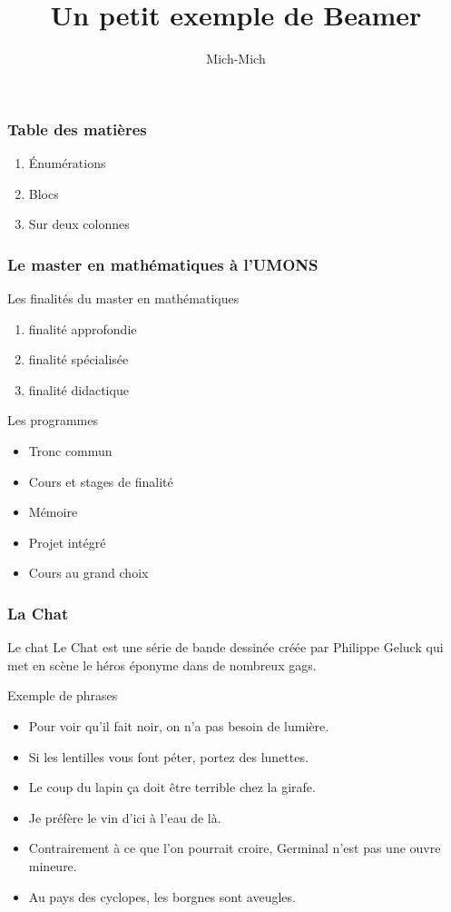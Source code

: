 \documentclass[12pt]{beamer}
\begin{document}
	\author{Mich-Mich}
	\title{Un petit exemple de Beamer}
	\frame{\maketitle}
	\begin{frame}
		\frametitle{Table des matières}
		\begin{enumerate}
			\item Énumérations
			\item Blocs
			\item Sur deux colonnes
		\end{enumerate}
	\end{frame}
	\begin{frame}
		\frametitle{Le master en mathématiques à l'UMONS}
		Les finalités du master en mathématiques
		\begin{enumerate}
			\item finalité approfondie
			\item finalité spécialisée
			\item finalité didactique
		\end{enumerate}
		Les programmes
		\begin{itemize}
			\item Tronc commun
			\item Cours et stages de finalité
			\item Mémoire
			\item Projet intégré
			\item Cours au grand choix
		\end{itemize}
	\end{frame}
	\begin{frame}
		\frametitle{La Chat}
		\begin{alertblock}{Le chat}	
			Le Chat est une série de bande dessinée créée par Philippe Geluck qui met en scène le héros éponyme dans de nombreux gags.
		\end{alertblock}
		\begin{exampleblock}{Exemple de phrases}
			\begin{itemize}
				\item Pour voir qu'il fait noir, on n'a pas besoin de lumière.
				\item Si les lentilles vous font péter, portez des lunettes.
				\item Le coup du lapin ça doit être terrible chez la girafe.
				\item Je préfère le vin d'ici à l'eau de là.
				\item Contrairement à ce que l'on pourrait croire, Germinal n'est pas une ouvre mineure.
				\item Au pays des cyclopes, les borgnes sont aveugles.
			\end{itemize}
		\end{exampleblock}
	\end{frame}
\end{document}

